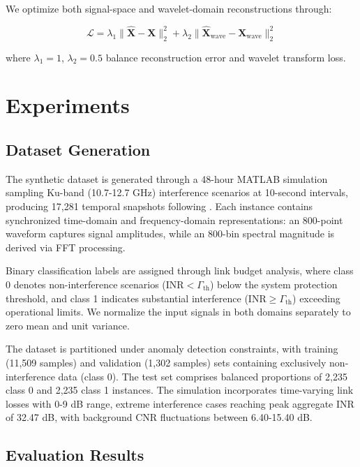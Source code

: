 \documentclass[10pt, conference]{IEEEtran}
\begin{document}
We optimize both signal-space and wavelet-domain reconstructions through:

\begin{equation}
    \mathcal{L} = \lambda_1 \|\mathbf{\hat{X}} - \mathbf{X}\|_2^2 + \lambda_2 \|\mathbf{\hat{X}}_{\text{wave}} - \mathbf{X}_{\text{wave}}\|_2^2
\end{equation}

where $\lambda_1=1$, $\lambda_2=0.5$ balance reconstruction error and wavelet transform loss.



\section{Experiments}

\subsection{Dataset Generation}
\label{sec:dataset}

The synthetic dataset is generated through a 48-hour MATLAB simulation sampling Ku-band (10.7-12.7 GHz) interference scenarios at 10-second intervals, producing 17,281 temporal snapshots following \cite{saifaldawlaGenAIBasedModelsNGSO2024}. Each instance contains synchronized time-domain and frequency-domain representations: an 800-point waveform captures signal amplitudes, while an 800-bin spectral magnitude is derived via FFT processing.

Binary classification labels are assigned through link budget analysis, where class 0 denotes non-interference scenarios ($\text{INR} < \Gamma_{\text{th}}$) below the system protection threshold, and class 1 indicates substantial interference ($\text{INR} \geq \Gamma_{\text{th}}$) exceeding operational limits. We normalize the input signals in both domains separately to zero mean and unit variance.

The dataset is partitioned under anomaly detection constraints, with training (11,509 samples) and validation (1,302 samples) sets containing exclusively non-interference data (class 0). The test set comprises balanced proportions of 2,235 class 0 and 2,235 class 1 instances. The simulation incorporates time-varying link losses with 0-9 dB range, extreme interference cases reaching peak aggregate INR of 32.47 dB, with background CNR fluctuations between 6.40-15.40 dB.

\subsection{Evaluation Results}
\end{document}
